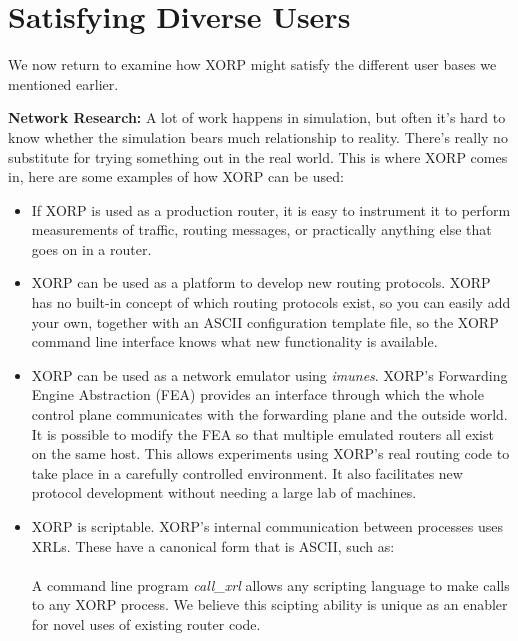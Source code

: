 \section{Satisfying Diverse Users}

\noindent We now return to examine how XORP might satisfy the different user
bases we mentioned earlier.

\vspace{0.1in}\noindent\textbf{Network Research:}
A lot of work happens in simulation,
but often it's hard to know whether the simulation bears much
relationship to reality.  There's really no substitute for trying
something out in the real world.  This is where XORP comes in, here are some examples of how XORP can be used:
\vspace{-0.07in}
\begin{itemize}
\item If XORP is used as a production router, it is easy to instrument
it to perform measurements of traffic, routing messages, or
practically anything else that goes on in a router.  
\vspace{-0.07in}
\item XORP can be used as a platform to develop new routing protocols.
XORP has no built-in concept of which routing protocols exist, so you
can easily add your own, together with an ASCII configuration template
file, so the XORP command line interface knows what new
functionality is available.
\vspace{-0.07in}
\item XORP can be used as a network emulator using {\it imunes}\cite{imunes}.
XORP's Forwarding Engine Abstraction (FEA) provides an
interface through which the whole control plane communicates
with the forwarding plane and the outside world.  It is possible to
modify the FEA so that multiple emulated routers all exist on the same
host.  This allows experiments using XORP's real routing code to take
place in a carefully controlled environment.  It also facilitates new
protocol development without needing a large lab of machines.
\vspace{-0.07in}
\item XORP is scriptable.  XORP's internal communication between
processes uses XRLs.
These have a canonical form that is ASCII, such as:\\
\parindent 20pt
\\
A command line program \textit{call\_xrl} 
allows any scripting language to make calls to any XORP process.  We
believe this scipting ability is unique as an enabler for novel uses of
existing router code.
\end{itemize}

